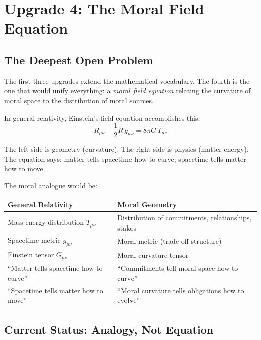 \documentclass[12pt,letterpaper]{article}
\theoremstyle{definition}
\begin{document}
\section{Upgrade 4: The Moral Field Equation}
\label{sec:field-equation}

\subsection{The Deepest Open Problem}

The first three upgrades extend the mathematical vocabulary. The fourth is the one that would unify everything: a \emph{moral field equation} relating the curvature of moral space to the distribution of moral sources.

In general relativity, Einstein's field equation accomplishes this:
\begin{equation}
R_{\mu\nu} - \frac{1}{2}R\, g_{\mu\nu} = 8\pi G\, T_{\mu\nu}
\end{equation}

The left side is geometry (curvature). The right side is physics (matter-energy). The equation says: matter tells spacetime how to curve; spacetime tells matter how to move.

The moral analogue would be:

\begin{center}
\begin{tabular}{ll}
\toprule
\textbf{General Relativity} & \textbf{Moral Geometry} \\
\midrule
Mass-energy distribution $T_{\mu\nu}$ & Distribution of commitments, relationships, stakes \\
Spacetime metric $g_{\mu\nu}$ & Moral metric (trade-off structure) \\
Einstein tensor $G_{\mu\nu}$ & Moral curvature tensor \\
``Matter tells spacetime how to curve'' & ``Commitments tell moral space how to curve'' \\
``Spacetime tells matter how to move'' & ``Moral curvature tells obligations how to evolve'' \\
\bottomrule
\end{tabular}
\end{center}

\subsection{Current Status: Analogy, Not Equation}
\end{document}
